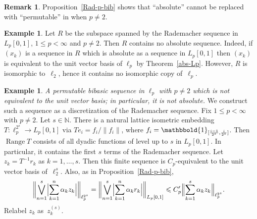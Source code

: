 \documentclass[12pt]{amsart}
\theoremstyle{plain}
\theoremstyle{definition}
\newtheorem{remark}[theorem]{Remark}
\newtheorem{example}[theorem]{Example}
\newcommand{\norm}[1]{\lVert#1\rVert}
\newcommand{\Bigabs}[1]{\Bigl\lvert#1\Bigr\rvert}
\newcommand{\Bignorm}[1]{\Bigl\lVert#1\Bigr\rVert}
\newcommand{\biggnorm}[1]{\biggl\lVert#1\biggr\rVert}
\def\one{\mathbbold{1}}
\DeclareMathOperator{\Range}{Range}
\renewcommand{\le}{\leqslant}
\begin{document}
\begin{remark}
  Proposition~\ref{Rad-p-bib} shows that ``absolute'' cannot be
  replaced with ``permutable'' in  when $p\neq 2$.
\end{remark}

\begin{example}
  Let $R$ be the subspace spanned by the Rademacher sequence in
  $L_p[0,1]$, $1\le p<\infty$ and $p\ne 2$. Then $R$ contains no
  absolute sequence. Indeed, if $(x_k)$ is a sequence in $R$ which is
  absolute as a sequence in $L_p[0,1]$ then $(x_k)$ is equivalent to
  the unit vector basis of $\ell_p$ by Theorem~\ref{abs-Lp}. However,
  $R$ is isomorphic to~$\ell_2$, hence it contains no isomorphic copy
  of~$\ell_p$.
\end{example}

\begin{example}
  \emph{A permutable bibasic sequence in $\ell_p$ with $p\ne 2$ which
    is not equivalent to the unit vector basis; in particular, it is
    not absolute.}  We construct such a sequence as a discretization
  of the Rademacher sequence.  Fix $1\le p<\infty$ with $p\ne 2$. Let
  $s\in\mathbb N$. There is a natural lattice isometric embedding
  $T\colon\ell_p^{2^s}\to L_p[0,1]$ via $Te_i=f_i/\norm{f_i}$, where
  $f_i=\one_{[\frac{i-1}{2^s},\frac{i}{2^s}]}$. Then $\Range T$
  consists of all dyadic functions of level up to $s$ in
  $L_p[0,1]$. In particular, it contains the first $s$ terms of the
  Rademacher sequence. Let $z_k=T^{-1}r_k$ as $k=1,\dots,s$. Then this
  finite sequence is $C_p$-equivalent to the unit vector basis
  of~$\ell_2^s$. Also, as in Proposition~\ref{Rad-p-bib},
  \begin{equation}\label{disr-Rad-est}
    \biggnorm{\bigvee_{n=1}^{s}\Bigabs{\sum_{k=1}^n\alpha_kz_k}}_{\ell_p^{2^s}}
    =\biggnorm{\bigvee_{n=1}^{s}\Bigabs{\sum_{k=1}^n\alpha_kr_k}}_{L_p[0,1]}
    \le C_p'\Bignorm{\sum_{k=1}^s\alpha_kz_k}_{\ell_p^{2^s}}.
  \end{equation}
  Relabel $z_k$ as~$z^{(s)}_k$.


\end{example}
\end{document}
